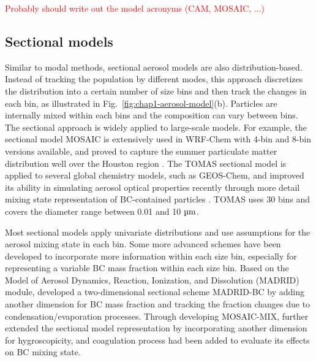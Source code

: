 \documentclass[edeposit,fullpage]{uiucthesis2009}
\begin{document}
\textcolor{red}{Probably should write out the model acronyms (CAM,
  MOSAIC, ...)}

\subsection{Sectional models}
Similar to modal methods, sectional aerosol models are also
distribution-based. Instead of tracking the population by different
modes, this approach discretizes the distribution into a certain
number of size bins and then track the changes in each bin, as
illustrated in Fig.~\ref{fig:chap1-aerosol-model}(b). Particles are
internally mixed within each bins and the composition can vary between
bins. The sectional approach is widely applied to large-scale
models. For example, the sectional model MOSAIC is extensively used in
WRF-Chem with 4-bin and 8-bin versions available, and proved to
capture the summer particulate matter distribution well over the
Houston region \citep{zaveri2008model,fast2006evolution}. The TOMAS
sectional model is applied to several global chemistry models, such as
GEOS-Chem, and improved its ability in simulating aerosol optical
properties recently through more detail mixing state representation of
BC-contained particles
\citep{adams2002predicting,pierce2013weak,kodros2018size}. TOMAS uses
30 bins and covers the diameter range between 0.01 and 10 $\rm \mu m$.

Most sectional models apply univariate distributions and use
assumptions for the aerosol mixing state in each bin. Some more
advanced schemes have been developed to incorporate more information
within each size bin, especially for representing a variable BC mass
fraction within each size bin. Based on the Model of Aerosol Dynamics,
Reaction, Ionization, and Dissolution (MADRID) module,
\citet{oshima2009aging} developed a two-dimensional sectional scheme
MADRID-BC by adding another dimension for BC mass fraction and
tracking the fraction changes due to condensation/evaporation
processes. Through developing MOSAIC-MIX, \citet{ching2016three}
further extended the sectional model representation by incorporating
another dimension for hygroscopicity, and coagulation process had been
added to evaluate its effects on BC mixing state.
\end{document}
